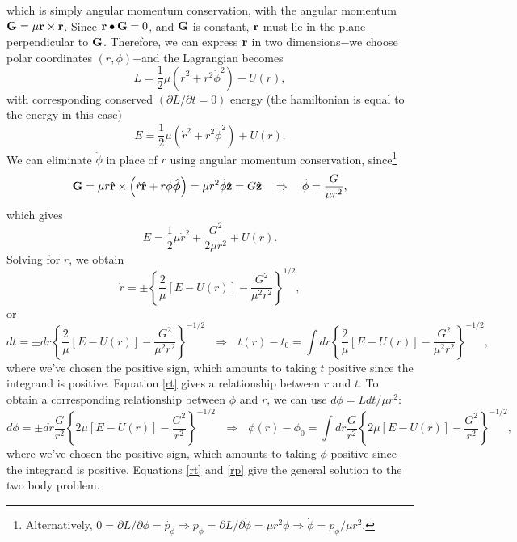 \documentclass[10pt]{article}
\begin{document}
\noindent which is simply angular momentum conservation, with the angular momentum ${\bf G} = \mu {\bf r} \times \dot{\bf r}$. Since ${\bf r} \bullet {\bf G} = 0$, and ${\bf G}$ is constant, $\bf r$ must lie in the plane perpendicular to ${\bf G}$. Therefore, we can express $\bf r$ in two dimensions$-$we choose polar coordinates $\left(r,\phi\right)$$-$and the Lagrangian becomes
\begin{equation*}
L = \frac{1}{2}\mu \left(\dot{r}^2+r^2\dot{\phi}^2\right) - U\left(r\right),
\end{equation*}
\noindent with corresponding conserved $\left(\partial L / \partial t = 0\right)$ energy (the hamiltonian is equal to the energy in this case)
\begin{equation*}
E = \frac{1}{2}\mu \left(\dot{r}^2+r^2\dot{\phi}^2\right) + U\left(r\right).
\end{equation*}
\noindent We can eliminate $\dot{\phi}$ in place of $r$ using angular momentum conservation, since\footnote{Alternatively, $0 = \partial L / \partial \phi = \dot{p_\phi} \Rightarrow p_\phi = \partial L / \partial \dot{\phi} = \mu r^2 \dot{\phi}  \Rightarrow \dot{\phi} = p_\phi / \mu r^2$.}
\begin{equation}\label{g}
{\bf G} = \mu r \hat{\bf r} \times \left(\dot{r} \hat{\bf r} + r \dot{\phi} \boldsymbol{\hat{\phi}}\right) = \mu r^2 \dot{\phi} \hat{\bf z} =  G \hat{\bf z} \ \ \ \Rightarrow \ \ \ \dot{\phi} = \frac{G}{\mu r^2},
\end{equation}
\noindent which gives
\begin{equation*}
E =\frac{1}{2} \mu \dot{r}^2 + \frac{G^2}{2 \mu r^2} + U\left(r\right).
\end{equation*}
\noindent Solving for $\dot r$, we obtain
\begin{equation*}
\dot{r} = \pm \left\{\frac{2}{\mu}\left[E-U\left(r\right)\right]-\frac{G^2}{\mu^2 r^2}\right\}^{1/2},
\end{equation*}
\noindent or
\begin{equation}\label{rt}
dt = \pm dr \left\{\frac{2}{\mu}\left[E-U\left(r\right)\right]-\frac{G^2}{\mu^2 r^2}\right\}^{-1/2} \ \ \ \Rightarrow \ \ \ t\left(r\right) - t_0 = \int dr \left\{\frac{2}{\mu}\left[E-U\left(r\right)\right]-\frac{G^2}{\mu^2 r^2}\right\}^{-1/2},
\end{equation}
\noindent where we've chosen the positive sign, which amounts to taking $t$ positive since the integrand is positive. Equation \ref{rt} gives a relationship between $r$ and $t$. To obtain a corresponding relationship between $\phi$ and $r$, we can use $d\phi = L dt / \mu r^2$:
\begin{equation}\label{rp}
d\phi = \pm dr \frac{G}{r^2} \left\{2 \mu \left[E-U\left(r\right)\right]-\frac{G^2}{r^2}\right\}^{-1/2} \ \ \ \Rightarrow \ \ \ \phi\left(r\right) - \phi_0 =  \int dr \frac{G}{r^2} \left\{2\mu \left[E-U\left(r\right)\right]-\frac{G^2}{ r^2}\right\}^{-1/2},
\end{equation}
\noindent where we've chosen the positive sign, which amounts to taking $\phi$ positive since the integrand is positive. Equations \ref{rt} and \ref{rp} give the general solution to the two body problem.
\end{document}
